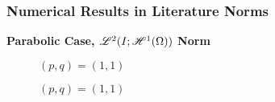 \begin{frame}
    \frametitle{Numerical Results in Literature Norms}

    \vspace*{\fill}
    \begin{center}
        {\color{\accentcolor} \Large \textbf{Parabolic Case, $\mathscr{L}^{2}(I; \mathscr{H}^{1}(\Omega))$ Norm}}
    \end{center}

    \vspace*{\fill}

    \begin{multicols}{2}

        \begin{center}
            \begin{minipage}{0.4\textwidth}
                \begin{figure}[!ht]
                    \caption{$\left( p, q  \right) = \left( 1, 1  \right)$}
                    \label{fig:p_1_1_par_l2h1}
                    
                \end{figure}
            \end{minipage}
        \end{center}

        \vfill\null
        \columnbreak

        \begin{center}
            \begin{minipage}{0.4\textwidth}
                \begin{figure}[!ht]
                    \caption{$\left( p, q  \right) = \left( 1, 1  \right)$}
                    \label{fig:p_2_2_par_l2h1}
                    
                \end{figure}
            \end{minipage}
        \end{center}

    \end{multicols}
    \vspace*{\fill}
    
\end{frame}

